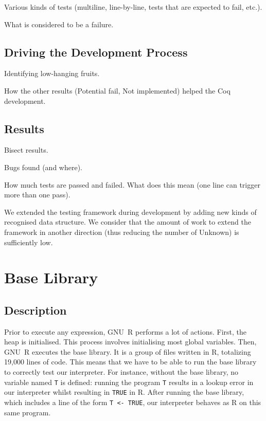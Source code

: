 \documentclass[
    sigplan,
    10pt,
    review, %
    natbib=false %
 ]{acmart}
\begin{document}
\todo{}

Various kinds of tests (multiline, line-by-line, tests that are expected to fail, etc.).

What is considered to be a failure.

\subsection{Driving the Development Process}
\label{sec:driving:development}

\todo{}

Identifying low-hanging fruits.

How the other results (Potential fail, Not implemented) helped the Coq development.

\subsection{Results}
\label{sec:test:results}

\todo{}

Bisect results.

Bugs found (and where).

How much tests are passed and failed.
What does this mean (one line can trigger more than one pass).

We extended the testing framework during development by adding new kinds of recognised
data structure.
We consider that the amount of work to extend the framework in another direction
(thus reducing the number of Unknown) is sufficiently low.


\section{Base Library}
\label{sec:library}

\subsection{Description}
\label{sec:library:description}

Prior to execute any expression, GNU~R performs a lot of actions.
First, the heap is initialised.
This process involves initialising most global variables.
Then, GNU~R executes the base library.
It is a group of files written in R,
totalizing 19,000 lines of code.
%
This means that we have to be able to run the base library
to correctly test our interpreter.
For instance, without the base library,
no variable named \texttt{T} is defined:
running the program \texttt{T} results in a lookup error
in our interpreter whilst resulting in \texttt{TRUE} in R.
After running the base library,
which includes a line of the form \texttt{T <- TRUE},
our interpreter behaves as R on this same program.
\end{document}
